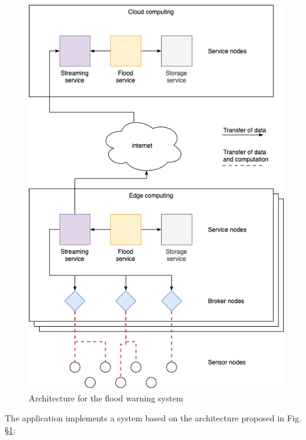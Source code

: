\begin{figure}[ht]
\centering
\includegraphics[width=\columnwidth]{figures/architecture-levee2}
\caption{Architecture for the flood warning system \label{fig:architecture-levee}}
\end{figure}

The application implements a system based on the architecture proposed in Fig. §\ref{fig:architecture-levee}:

